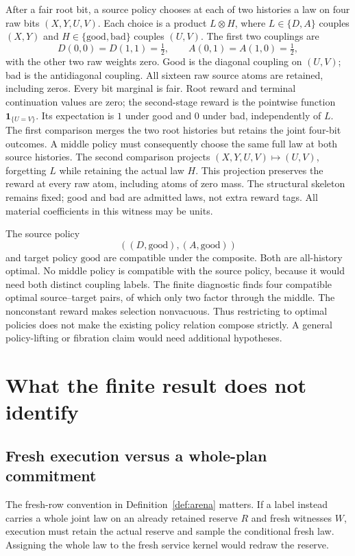 \documentclass[11pt]{article}
\theoremstyle{definition}
\begin{document}
After a fair root bit, a source policy chooses at each of two histories a
law on four raw bits \((X,Y,U,V)\). Each choice is a product
\(L\otimes H\), where \(L\in\{D,A\}\) couples \((X,Y)\) and
\(H\in\{\mathrm{good},\mathrm{bad}\}\) couples \((U,V)\).
The first two couplings are
\[
 D(0,0)=D(1,1)=\tfrac12,\qquad
 A(0,1)=A(1,0)=\tfrac12,
\]
with the other two raw weights zero. Good is the diagonal coupling on
\((U,V)\); bad is the antidiagonal coupling. All sixteen raw source
atoms are retained, including zeros. Every bit marginal is fair.
Root reward and terminal continuation values are zero; the second-stage
reward is the pointwise function \(\mathbf1_{\{U=V\}}\). Its expectation
is \(1\) under good and \(0\) under bad, independently of \(L\).
The first comparison merges the two root histories but retains the joint
four-bit outcomes. A middle policy must consequently choose the same full
law at both source histories. The second comparison projects
\((X,Y,U,V)\mapsto(U,V)\), forgetting \(L\) while retaining the actual
law \(H\). This projection preserves the reward at every raw atom,
including atoms of zero mass. The structural skeleton remains fixed;
good and bad are admitted laws, not extra reward tags. All material
coefficients in this witness may be units.

The source policy
\[
 ((D,\mathrm{good}),(A,\mathrm{good}))
\]
and target policy \(\mathrm{good}\) are compatible under the composite.
Both are all-history optimal. No middle policy is compatible with the
source policy, because it would need both distinct coupling labels.
The finite diagnostic finds four compatible optimal source--target pairs,
of which only two factor through the middle. The nonconstant reward makes
selection nonvacuous. Thus restricting to optimal policies does not make
the existing policy relation compose strictly. A general policy-lifting
or fibration claim would need additional hypotheses.

\section{What the finite result does not identify}
\label{sec:boundaries}
\subsection{Fresh execution versus a whole-plan commitment}
The fresh-row convention in Definition~\ref{def:arena} matters. If a label
instead carries a whole joint law on an already retained reserve \(R\)
and fresh witnesses \(W\), execution must retain the actual reserve and
sample the conditional fresh law. Assigning the whole law to the fresh
service kernel would redraw the reserve.
\end{document}
